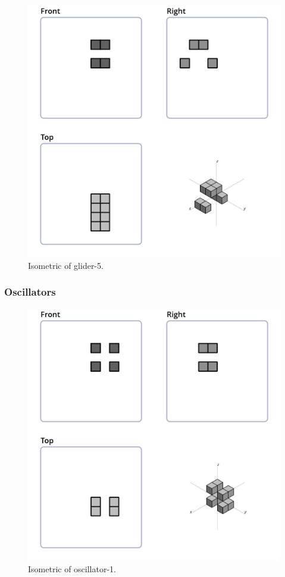 \begin{figure}[H]
  \centering
  \includegraphics[scale=0.532]{iso_settings/glider_5.png}
  \caption{Isometric of glider-5.}
  \label{fig:iso-glider-5}
\end{figure}

\subsubsection{Oscillators}

\begin{figure}[H]
	\centering
	\includegraphics[scale=0.532]{iso_settings/osc_1.png}
	\caption{Isometric of oscillator-1.}
  \label{fig:iso-osc-1}
\end{figure}

